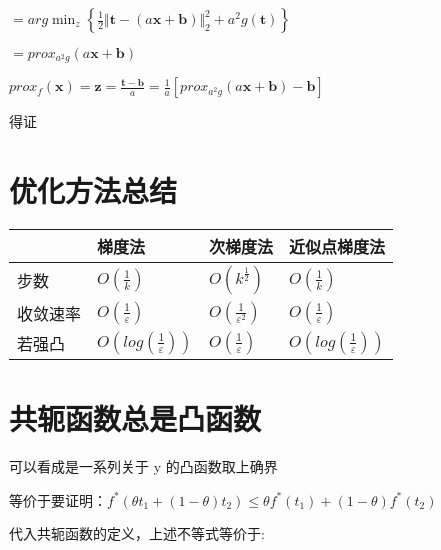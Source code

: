 \documentclass[12pt, a4paper, oneside, fontset=windows]{ctexart}
\begin{document}
$=arg\min_{z}\left \{ \frac{1}{2}\Vert \mathbf t - \left ( a\mathbf x +\mathbf b \right )\Vert _2^{2}+a^{2}g \left (\mathbf t \right )\right \}$

$=prox_{a^{2}g}\left ( a\mathbf x+\mathbf b\right )$

$prox_{f}\left ( \mathbf x \right )=\mathbf z=\frac{\mathbf t-\mathbf b}{a}=\frac{1}{a}\left [prox_{a^{2}g}\left ( a\mathbf x+\mathbf b\right )-\mathbf b  \right ]$

得证
\section{优化方法总结}

\begin{table}[h]
    \centering
    \begin{tabular}{llll}
    \hline
    {\ul } & 梯度法                                       & 次梯度法                                          & 近似点梯度法                                    \\ \hline
    步数     & $O\left ( \frac{1}{k} \right )$           & $O\left ( {k}^{\frac{1}{2}} \right )$         & $O\left ( \frac{1}{k} \right )$           \\
    收敛速率   & $O\left ( \frac{1}{\varepsilon} \right )$ & $O\left ( \frac{1}{\varepsilon^{2}} \right )$ & $O\left ( \frac{1}{\varepsilon} \right )$ \\
    若强凸    & $O\left ( log\left ( \frac{1}{\varepsilon  } \right ) \right )$                          &$O\left ( \frac{1}{\varepsilon} \right )$                        &$O\left ( log\left ( \frac{1}{\varepsilon  } \right ) \right )$                                           \\ \hline
    \end{tabular}
    \end{table}
\section{共轭函数总是凸函数}

可以看成是一系列关于 y 的凸函数取上确界

等价于要证明：$f^{*}\left ( \theta t_{1}+\left ( 1-\theta  \right )t_{2} \right )\leq \theta f^{*}\left ( t_{1} \right )+\left ( 1-\theta  \right )f^{*}\left ( t_{2} \right )$

代入共轭函数的定义，上述不等式等价于:
\end{document}
